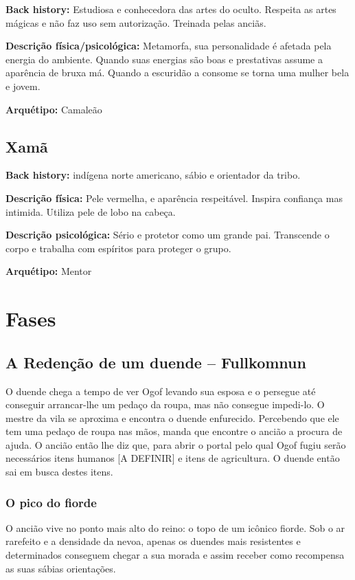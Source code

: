 \textbf{Back history:} Estudiosa e conhecedora das artes do oculto. Respeita as artes mágicas e não faz uso sem autorização. Treinada pelas anciãs.

\textbf{Descrição física/psicológica:} Metamorfa, sua personalidade é afetada pela energia do ambiente. Quando suas energias são boas e prestativas assume a aparência de bruxa má. Quando a escuridão a consome se torna uma mulher bela e jovem.

\textbf{Arquétipo: }Camaleão

\subsection{Xamã}

\textbf{Back history: }indígena norte americano, sábio e orientador da tribo.

\textbf{Descrição física: }Pele vermelha, e aparência respeitável. Inspira confiança mas intimida. Utiliza pele de lobo na cabeça.

\textbf{Descrição psicológica:} Sério e protetor como um grande pai. Transcende o corpo e trabalha com espíritos para proteger o grupo.

\textbf{Arquétipo:} Mentor

\section{Fases}

\subsection{A Redenção de um duende -- Fullkomnun}
O duende chega a tempo de ver Ogof levando sua esposa e o persegue até conseguir arrancar-lhe um pedaço da roupa, mas não consegue impedi-lo. O mestre da vila se aproxima e encontra o duende enfurecido. Percebendo que ele tem uma pedaço de roupa nas mãos,  manda que encontre o ancião a procura de ajuda.
O ancião então lhe diz que, para abrir o portal pelo qual Ogof fugiu serão necessários itens humanos [A DEFINIR] e itens de agricultura. O duende então sai em busca destes itens.

\subsubsection{O pico do fiorde}
O  ancião vive no ponto mais alto do reino: o topo de um icônico fiorde. Sob o ar rarefeito e a densidade da nevoa, apenas os duendes mais resistentes e determinados conseguem chegar a sua morada e assim receber como recompensa as suas sábias orientações.

